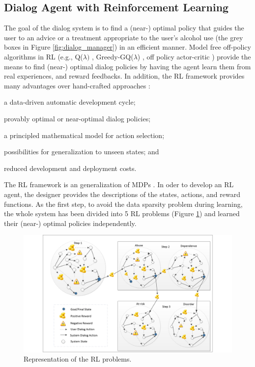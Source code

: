 \documentclass[letterpaper]{article}
\begin{document}
\begin{inparaenum}[1)]
\subsection*{Dialog Agent with Reinforcement Learning}

The goal of the dialog system is to find a (near-) optimal policy that guides the user to an advice 
or a treatment appropriate to the user's alcohol use (the grey boxes in Figure \ref{fig:dialog_manager}) in an efficient manner. 
Model free off-policy algorithms in RL (e.g., Q($\lambda)$ \cite{sutton1998reinforcement}, 
Greedy-GQ($\lambda$) \cite{maei2010toward}, off policy actor-critic \cite{DegrisWS12}) provide the 
means to find (near-) optimal dialog policies by having the agent learn them 
from real experiences, and reward feedbacks. In addition, the RL framework provides many advantages over hand-crafted approaches \cite{lemon2007machine}: \begin{inparaenum}[1)] \item a 
data-driven automatic development cycle; \item provably optimal or near-optimal dialog policies; 
\item  a principled mathematical model for action selection; \item  possibilities for generalization 
to unseen states; and \item reduced development and deployment costs.\end{inparaenum} 

The RL framework is an generalization of MDPs \cite{sutton1998reinforcement}. In oder to develop an RL 
agent, the designer provides the descriptions of the states, actions, and reward functions. As the 
first step, to avoid the data sparsity problem during learning, the whole system has been 
divided into 5 RL problems (Figure \ref{fig:5mdpv2}) and learned their 
(near-) optimal policies independently. 

\begin{figure}[!t]
  \centering    
	\includegraphics[width=1.0\textwidth]{figures/5MDPV2}
	\caption{Representation of the RL problems.}
  \label{fig:5mdpv2}
\end{figure}


\end{inparaenum}
\end{document}

